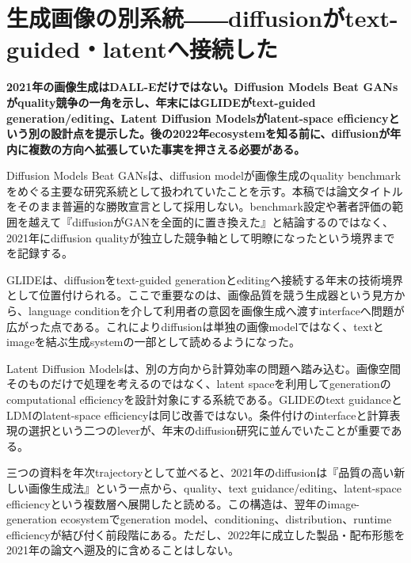 \section{生成画像の別系統――diffusionがtext-guided・latentへ接続した}
\label{pkg:diffusion-media}
\noindent\textbf{2021年の画像生成はDALL-Eだけではない。Diffusion Models Beat GANsがquality競争の一角を示し、年末にはGLIDEがtext-guided generation/editing、Latent Diffusion Modelsがlatent-space efficiencyという別の設計点を提示した。後の2022年ecosystemを知る前に、diffusionが年内に複数の方向へ拡張していた事実を押さえる必要がある。}\autocite{src-11a149a699a0,src-50244427230b,src-a4561c635fe6}

Diffusion Models Beat GANsは、diffusion modelが画像生成のquality benchmarkをめぐる主要な研究系統として扱われていたことを示す。本稿では論文タイトルをそのまま普遍的な勝敗宣言として採用しない。benchmark設定や著者評価の範囲を越えて『diffusionがGANを全面的に置き換えた』と結論するのではなく、2021年にdiffusion qualityが独立した競争軸として明瞭になったという境界までを記録する。\autocite{src-11a149a699a0}


GLIDEは、diffusionをtext-guided generationとeditingへ接続する年末の技術境界として位置付けられる。ここで重要なのは、画像品質を競う生成器という見方から、language conditionを介して利用者の意図を画像生成へ渡すinterfaceへ問題が広がった点である。これによりdiffusionは単独の画像modelではなく、textとimageを結ぶ生成systemの一部として読めるようになった。\autocite{src-50244427230b}


Latent Diffusion Modelsは、別の方向から計算効率の問題へ踏み込む。画像空間そのものだけで処理を考えるのではなく、latent spaceを利用してgenerationのcomputational efficiencyを設計対象にする系統である。GLIDEのtext guidanceとLDMのlatent-space efficiencyは同じ改善ではない。条件付けのinterfaceと計算表現の選択という二つのleverが、年末のdiffusion研究に並んでいたことが重要である。\autocite{src-a4561c635fe6}


三つの資料を年次trajectoryとして並べると、2021年のdiffusionは『品質の高い新しい画像生成法』という一点から、quality、text guidance/editing、latent-space efficiencyという複数層へ展開したと読める。この構造は、翌年のimage-generation ecosystemでgeneration model、conditioning、distribution、runtime efficiencyが結び付く前段階にある。ただし、2022年に成立した製品・配布形態を2021年の論文へ遡及的に含めることはしない。\autocite{src-11a149a699a0,src-50244427230b,src-a4561c635fe6}


